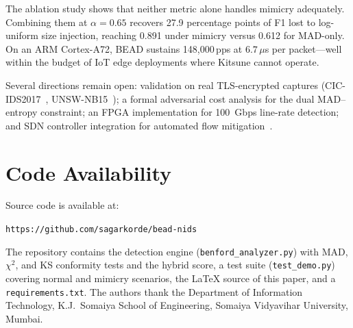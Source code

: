\documentclass[conference]{IEEEtran}
\begin{document}
The ablation study shows that neither metric alone handles mimicry
adequately. Combining them at $\alpha=0.65$ recovers 27.9 percentage
points of F1 lost to log-uniform size injection, reaching 0.891 under
mimicry versus 0.612 for MAD-only. On an ARM Cortex-A72, BEAD sustains
148,000\,pps at $6.7\,\mu$s per packet—well within the budget of
IoT edge deployments where Kitsune cannot operate.

Several directions remain open: validation on real TLS-encrypted captures
(CIC-IDS2017~\cite{b19}, UNSW-NB15~\cite{b20}); a formal adversarial cost
analysis for the dual MAD--entropy constraint; an FPGA implementation for
100~Gbps line-rate detection; and SDN controller integration for
automated flow mitigation~\cite{b22}.

\section*{Code Availability}

Source code is available at:
\begin{center}
\texttt{https://github.com/sagarkorde/bead-nids}
\end{center}
The repository contains the detection engine (\texttt{benford\_analyzer.py})
with MAD, $\chi^2$, and KS conformity tests and the hybrid score, a test
suite (\texttt{test\_demo.py}) covering normal and mimicry scenarios, the
\LaTeX{} source of this paper, and a \texttt{requirements.txt}.
The authors thank the Department of Information Technology, K.J.~Somaiya
School of Engineering, Somaiya Vidyavihar University, Mumbai.
\end{document}
